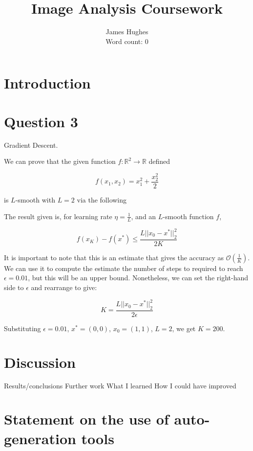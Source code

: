 \documentclass[12pt]{article}
\title{Image Analysis Coursework}
\author{James Hughes\\ Word count: 0}
\begin{document}
\maketitle

\newpage

\tableofcontents

\newpage

\section{Introduction}


\section{Question 3}

Gradient Descent.

We can prove that the given function $f:\mathbb{R}^2\rightarrow\mathbb{R}$ defined

\[f(x_1,x_2) = x_1^2 + \frac{x_2^2}{2}\]

is $L$-smooth with $L=2$ via the following

The result given is, for learning rate $\eta=\frac{1}{L}$, and an $L$-smooth function $f$,

\[f(x_K) - f(x^*) \leq \frac{L||x_0-x^*||_2^2}{2K}\]

It is important to note that this is an estimate that gives the accuracy as $\mathcal{O}(\frac{1}{K})$.
We can use it to compute the estimate the number of steps to required to reach $\epsilon=0.01$,
but this will be an upper bound.
Nonetheless, we can set the right-hand side to $\epsilon$ and rearrange to give:

\[K = \frac{L||x_0-x^*||_2^2}{2\epsilon}\]

Substituting $\epsilon=0.01$, $x^*=(0,0)$, $x_0=(1,1)$, $L=2$, we get $K=200$.

\section{Discussion}
Results/conclusions
Further work
What I learned
How I could have improved \cite{keypaper}




\appendix

\section{Statement on the use of auto-generation tools}
\end{document}

